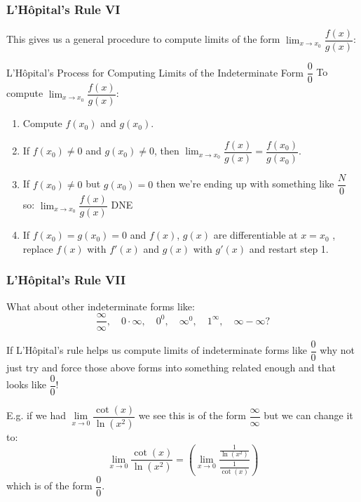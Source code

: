 \documentclass{ltx-talk}
\begin{document}
\begin{frame}
  \frametitle{L'Hôpital's Rule VI}

  This gives us a general procedure to compute limits of the form $\lim_{x \rightarrow x_0}\dfrac{f(x)}{g(x)}$: \pause

  \begin{alertblock}
    {L'Hôpital's Process for Computing Limits of the Indeterminate Form $\dfrac{0}{0}$}
    To compute $\lim_{x \rightarrow x_0} \dfrac{f(x)}{g(x)}$:
    \begin{enumerate}
      \item Compute $f(x_0)$ and $g(x_0)$. \pause
      \item If $f(x_0) \neq 0$ and $g(x_0) \neq 0$, \pause then $\lim_{x \rightarrow x_0} \dfrac{f(x)}{g(x)} = \dfrac{f(x_0)}{g(x_0)}$. \pause
      \item If $f(x_0) \neq 0$ but $g(x_0) = 0$ then we're ending up with something like $\dfrac{N}{0}$ so: \pause $\lim_{x \rightarrow x_0}\dfrac{f(x)}{g(x)}$ DNE \pause
      \item If $f(x_0) = g(x_0) = 0$ and $f(x)$, $g(x)$ are differentiable at $x = x_0$ \pause, replace $f(x)$ with $f'(x)$ and $g(x)$ with $g'(x)$
        and restart step 1.
    \end{enumerate} \pause
  \end{alertblock}
\end{frame}

\begin{frame}
  \frametitle{L'Hôpital's Rule VII}

  What about other indeterminate forms like: \pause
  \begin{equation*}
    \dfrac{\infty}{\infty}, \quad 0 \cdot \infty, \quad 0^0, \quad \infty^0, \quad 1^\infty, \quad \infty - \infty?
  \end{equation*} \pause

  If L'Hôpital's rule helps us compute limits of indeterminate forms like $\dfrac{0}{0}$ \pause why not just try and force those above forms into something related enough and that looks like $\dfrac{0}{0}$! \pause

  E.g. if we had $\lim\limits_{x \rightarrow 0} \dfrac{\cot(x)}{\ln(x^2)}$ \pause
  we see this is of the form $\dfrac{\infty}{\infty}$ \pause but we can change it to:
  \begin{equation*}
    \lim\limits_{x \rightarrow 0} \dfrac{\cot(x)}{\ln(x^2)} = \left(\lim\limits_{x \rightarrow 0} \dfrac{\frac{1}{\ln(x^2)}}{\frac{1}{\cot(x)}}\right)
  \end{equation*} \pause
  which is of the form $\dfrac{0}{0}$.
\end{frame}
\end{document}
